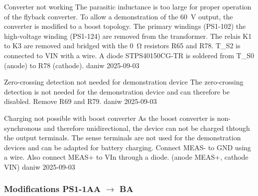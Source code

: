 \begin{ModTable}

\ModItemDone
{Converter not working}
{The parasitic inductance is too large for proper operation of the flyback converter. To allow a demonstration of the \qty{60}{\volt} output, the converter is modified to a boost topology. }
{The primary windings (PS1-102) the high-voltage winding (PS1-124) are removed from the transformer. The relais K1 to K3 are removed and bridged with the \qty{0}{\ohm} resistors R65 and R78. T\_S2 is connected to VIN with a wire. A diode STPS40150CG-TR is soldered from T\_S0 (anode) to R78 (cathode). }
{daniw}
{2025-09-03}

\ModItemDone
{Zero-crossing detection not needed for demonstration device}
{The zero-crossing detection is not needed for the demonstration device and can therefore be disabled. }
{Remove R69 and R79. }
{daniw}
{2025-09-03}

\ModItemDone
{Charging not possible with boost converter}
{As the boost converter is non-synchronous and therefore unidirectional, the device can not be charged thtough the output terminals. The sense terminals are not used for the demonstration devices and can be adapted for battery charging. }
{Connect MEAS- to GND using a wire. Also connect MEAS+ to VIn through a diode. (anode MEAS+, cathode VIN)}
{daniw}
{2025-09-03}

\end{ModTable}

\FloatBarrier

\subsubsection{Modifications PS1-1AA $\to$ BA}


